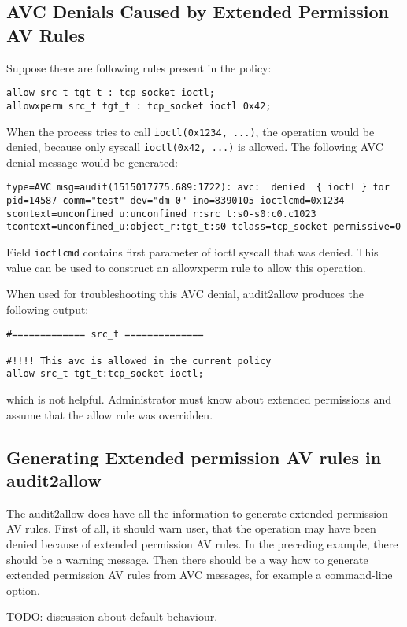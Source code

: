 \subsection{AVC Denials Caused by Extended Permission AV Rules}
Suppose there are following rules present in the policy:
\begin{lstlisting}
allow src_t tgt_t : tcp_socket ioctl;
allowxperm src_t tgt_t : tcp_socket ioctl 0x42;
\end{lstlisting}
When the process tries to call \texttt{ioctl(0x1234, ...)}, the operation would
be denied, because only syscall \texttt{ioctl(0x42, ...)} is allowed. The
following AVC denial message would be generated:
\begin{lstlisting}
type=AVC msg=audit(1515017775.689:1722): avc:  denied  { ioctl } for
pid=14587 comm="test" dev="dm-0" ino=8390105 ioctlcmd=0x1234
scontext=unconfined_u:unconfined_r:src_t:s0-s0:c0.c1023
tcontext=unconfined_u:object_r:tgt_t:s0 tclass=tcp_socket permissive=0
\end{lstlisting}
Field \texttt{ioctlcmd} contains first parameter of ioctl syscall that was
denied. This value can be used to construct an allowxperm rule to allow this
operation.

When used for troubleshooting this AVC denial, audit2allow produces the
following output:
\begin{lstlisting}
#============= src_t ==============

#!!!! This avc is allowed in the current policy
allow src_t tgt_t:tcp_socket ioctl;
\end{lstlisting}
which is not helpful. Administrator must know about extended permissions and
assume that the allow rule was overridden.

\subsection{Generating Extended permission AV rules in audit2allow}
The audit2allow does have all the information to generate extended permission AV
rules. First of all, it should warn user, that the operation may have been
denied because of extended permission AV rules. In the preceding example, there
should be a warning message. Then there should be a way how to generate extended
permission AV rules from AVC messages, for example a command-line option.

TODO: discussion about default behaviour.

